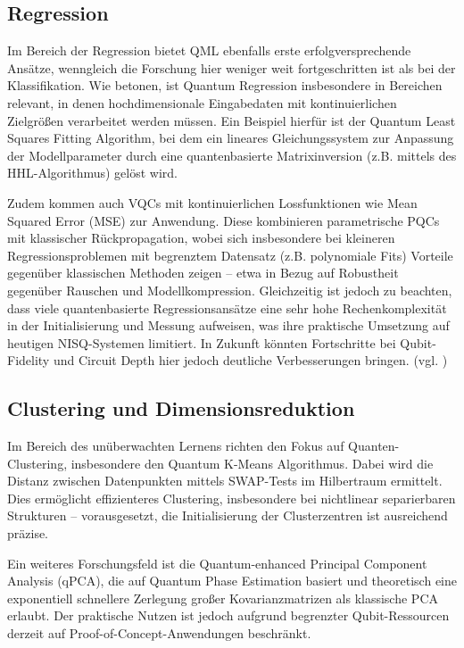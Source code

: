 \subsection{Regression}
Im Bereich der Regression bietet QML ebenfalls erste erfolgversprechende Ansätze, wenngleich die Forschung hier weniger weit fortgeschritten ist als bei der Klassifikation. Wie \cite{chengNoisyIntermediatescaleQuantum2023} betonen, ist Quantum Regression insbesondere in Bereichen relevant, in denen hochdimensionale Eingabedaten mit kontinuierlichen Zielgrößen verarbeitet werden müssen. Ein Beispiel hierfür ist der Quantum Least Squares Fitting Algorithm, bei dem ein lineares Gleichungssystem zur Anpassung der Modellparameter durch eine quantenbasierte Matrixinversion (z.B. mittels des HHL-Algorithmus) gelöst wird.

Zudem kommen auch VQCs mit kontinuierlichen Lossfunktionen wie Mean Squared Error (MSE) zur Anwendung. Diese kombinieren parametrische PQCs mit klassischer Rückpropagation, wobei sich insbesondere bei kleineren Regressionsproblemen mit begrenztem Datensatz (z.B. polynomiale Fits) Vorteile gegenüber klassischen Methoden zeigen – etwa in Bezug auf Robustheit gegenüber Rauschen und Modellkompression.
Gleichzeitig ist jedoch zu beachten, dass viele quantenbasierte Regressionsansätze eine sehr hohe Rechenkomplexität in der Initialisierung und Messung aufweisen, was ihre praktische Umsetzung auf heutigen NISQ-Systemen limitiert. In Zukunft könnten Fortschritte bei Qubit-Fidelity und Circuit Depth hier jedoch deutliche Verbesserungen bringen. (vgl. \cite{schuld_et_al_quantum_2019})


\subsection{Clustering und Dimensionsreduktion}
Im Bereich des unüberwachten Lernens richten \cite{gujjuQuantumMachineLearning2024} den Fokus auf Quanten-Clustering, insbesondere den Quantum K-Means Algorithmus. Dabei wird die Distanz zwischen Datenpunkten mittels SWAP-Tests im Hilbertraum ermittelt. Dies ermöglicht effizienteres Clustering, insbesondere bei nichtlinear separierbaren Strukturen – vorausgesetzt, die Initialisierung der Clusterzentren ist ausreichend präzise.

Ein weiteres Forschungsfeld ist die Quantum-enhanced Principal Component Analysis (qPCA), die auf Quantum Phase Estimation basiert und theoretisch eine exponentiell schnellere Zerlegung großer Kovarianzmatrizen als klassische PCA erlaubt. Der praktische Nutzen ist jedoch aufgrund begrenzter Qubit-Ressourcen derzeit auf Proof-of-Concept-Anwendungen beschränkt.

